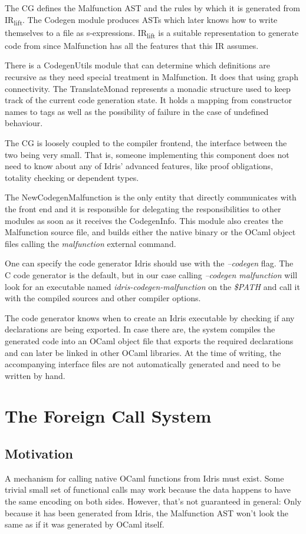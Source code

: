 The CG defines the Malfunction
AST and the rules by which it is generated
from
IR\textsubscript{lift}. The Codegen module produces ASTs
which later knows how to write themselves to a file as
s-expressions.
IR\textsubscript{lift} is a suitable representation to generate
code from since Malfunction has all the features that this
IR assumes.

There is a CodegenUtils module that can determine which
definitions are recursive as they need special treatment
in Malfunction. It does that using graph connectivity.
The TranslateMonad represents a monadic structure used
to keep track of the current code generation state.
It holds a mapping from constructor names to tags as well
as the possibility of failure in the case of undefined
behaviour.

The CG is loosely coupled to the compiler frontend,
the interface between the two being very small.
That is, someone implementing this component does not need
to know about any of Idris' advanced features, like proof
obligations, totality checking or dependent types.

The NewCodegenMalfunction is the only entity that directly
communicates with the front end and it is responsible for
delegating the responsibilities to other modules as
soon as it receives the CodegenInfo. This module also creates
the Malfunction source file, and builds either the native binary
or the OCaml object files calling the \emph{malfunction}
external command.

One can specify the code generator Idris should use with
the \emph{--codegen } flag.
The C code generator is the default, but in our case
calling \emph{--codegen malfunction} will look for an
executable named \emph{idris-codegen-malfunction} on the
\emph{\$PATH} and call it with the compiled sources and
other compiler options.

The code generator knows when to create an Idris executable
by checking if any declarations are being exported.
In case there are, the system compiles the generated code
into an OCaml object file that exports the required declarations
and can later be linked in other OCaml libraries. At the time
of writing, the accompanying interface files are not
automatically generated and need to be written by hand.



\section{The Foreign Call System}
\subsection{Motivation}
A mechanism for calling native OCaml functions from
Idris must exist.
Some trivial small set of functional calls may work
because the data happens to have the same encoding on
both sides. However, that's not guaranteed in general:
Only because it has been generated from Idris, the Malfunction
AST won't look the same as if it was generated by OCaml itself.

